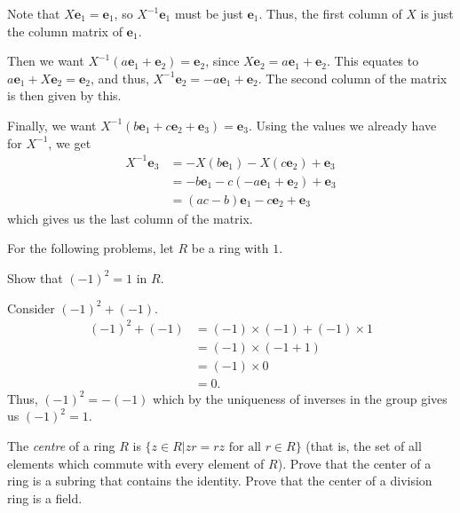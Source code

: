 \documentclass[12 pt, letterpaper]{hmcpset}
\begin{document}
\begin{solution}
\begin{enumerate}
			Note that $X \mathbf e_1 = \mathbf e_1$, so $X^{-1} \mathbf e_1$ must be just $\mathbf e_1$. Thus, the first column of $X$ is just the column matrix of $\mathbf e_1$. 

			Then we want $X^{-1}(a \mathbf e_1 + \mathbf e_2) = \mathbf e_2$, since $X \mathbf e_2 = a \mathbf e_1 + \mathbf e_2$. This equates to $a \mathbf e_1 + X \mathbf e_2 = \mathbf e_2$, and thus, $X^{-1} \mathbf e_2 = - a \mathbf e_1 + \mathbf e_2$. The second column of the matrix is then given by this. 

			Finally, we want $X^{-1}(b \mathbf e_1 + c \mathbf e_2 + \mathbf e_3) = \mathbf e_3$. Using the values we already have for $X^{-1}$, we get
			\[
				\begin{split}
					X^{-1} \mathbf e_3 & = - X(b \mathbf e_1) - X(c \mathbf e_2) + \mathbf e_3 \\
							   & = - b \mathbf e_1 - c (- a \mathbf e_1 + \mathbf e_2) + \mathbf e_3 \\
							   & = (ac - b) \mathbf e_1 - c \mathbf e_2 + \mathbf e_3
				\end{split}
			\]
			which gives us the last column of the matrix.
	\end{enumerate}
\end{solution}

\pagebreak

For the following problems, let $R$ be a ring with $1$.

\begin{problem}
	Show that $(-1)^2 = 1$ in $R$.
\end{problem}

\begin{solution}
	Consider $(-1)^2 + (-1)$.
	\[
		\begin{split}
			(-1)^2 + (-1) & = (-1) \times (-1) + (-1) \times 1 \\
				      & = (-1) \times (-1 + 1) \\
				      & = (-1) \times 0 \\
				      & = 0.
		\end{split}
	\]
	Thus, $(-1)^2 = -(-1)$ which by the uniqueness of inverses in the group gives us $(-1)^2 = 1$.
\end{solution}

\pagebreak

\begin{problem}
	The \textit{centre} of a ring $R$ is $\{ z \in R | zr = rz \text{ for all } r \in R \}$ (that is, the set of all elements which commute with every element of $R$). Prove that the center of a ring is a subring that contains the identity. Prove that the center of a division ring is a field.
\end{problem}
\end{document}
